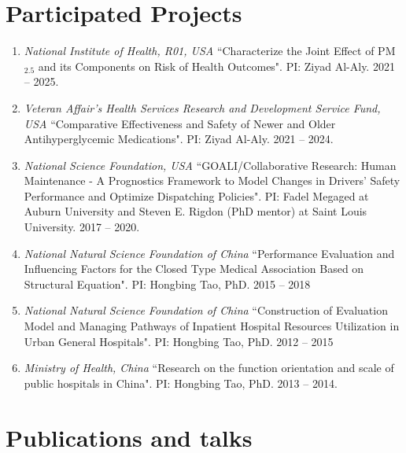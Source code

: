\documentclass[11pt, a4paper]{article}
\begin{document}
	\section*{Participated Projects}
	\begin{enumerate}[leftmargin=0ex,itemsep=1ex]
		\item \emph{National Institute of Health, R01, USA } ``Characterize the Joint Effect of PM$_2.5$ and its Components on Risk of Health Outcomes". PI: Ziyad Al-Aly. 2021 -- 2025. 
		
		\item \emph{Veteran Affair's Health Services Research and Development Service Fund, USA } ``Comparative Effectiveness and Safety of Newer and Older Antihyperglycemic Medications". PI: Ziyad Al-Aly. 2021 -- 2024. 
		
		\item \emph{National Science Foundation, USA } ``GOALI/Collaborative Research: Human Maintenance - A Prognostics Framework to Model Changes in Drivers' Safety Performance and Optimize Dispatching Policies". PI: Fadel Megaged at Auburn University and Steven E. Rigdon (PhD mentor) at Saint Louis University. 2017 -- 2020. 
		
		\item \emph{National Natural Science Foundation of China } ``Performance Evaluation and Influencing Factors for the Closed Type Medical Association Based on Structural Equation". PI: Hongbing Tao, PhD. 2015 -- 2018
		
		\item \emph{National Natural Science Foundation of China } ``Construction of Evaluation Model and Managing Pathways of Inpatient Hospital Resources Utilization in Urban General Hospitals". PI: Hongbing Tao, PhD. 2012 -- 2015
		
		\item \emph{Ministry of Health, China } ``Research on the function orientation and scale of public hospitals in China". PI: Hongbing Tao, PhD. 2013 -- 2014.
	\end{enumerate}


	
	

	\section*{Publications and talks}
\end{document}

